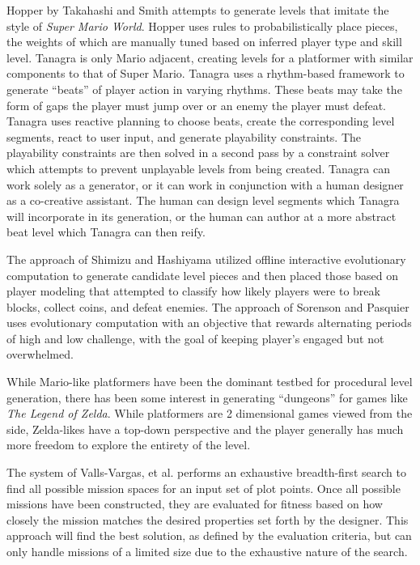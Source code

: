 \documentclass[12pt]{report}
\begin{document}
Hopper by Takahashi and Smith \cite{mario2010} attempts to generate levels that imitate the style of \textit{Super Mario World}.  Hopper uses rules to probabilistically place pieces, the weights of which are manually tuned based on inferred player type and skill level. Tanagra \cite{tanagra} is only Mario adjacent, creating levels for a platformer with similar components to that of Super Mario.  Tanagra uses a rhythm-based framework to generate ``beats'' of player action in varying rhythms.  These beats may take the form of gaps the player must jump over or an enemy the player must defeat.   Tanagra uses reactive planning to choose beats, create the corresponding level segments, react to user input, and generate playability constraints.  The playability constraints are then solved in a second pass by a constraint solver which attempts to prevent unplayable levels from being created.  Tanagra can work solely as a generator, or it can work in conjunction with a human designer as a co-creative assistant.  The human can design level segments which Tanagra will incorporate in its generation, or the human can author at a more abstract beat level which Tanagra can then reify.

The approach of Shimizu and Hashiyama \cite{mario2010} utilized offline interactive evolutionary computation to generate candidate level pieces and then placed those based on player modeling that attempted to classify how likely players were to break blocks, collect coins, and defeat enemies.  The approach of Sorenson and Pasquier \cite{mario2010} uses evolutionary computation with an objective that rewards alternating periods of high and low challenge, with the goal of keeping player's engaged but not overwhelmed.  

While Mario-like platformers have been the dominant testbed for procedural level generation, there has been some interest in generating ``dungeons'' for games like \textit{The Legend of Zelda}.  While platformers are 2 dimensional games viewed from the side, Zelda-likes have a top-down perspective and the player generally has much more freedom to explore the entirety of the level.

  The system of Valls-Vargas, et al. \cite{VARGASPLOTPOINTS} performs an exhaustive breadth-first search to find all possible  mission spaces for an input set of plot points.  Once all possible missions have been constructed, they are evaluated for fitness based on how closely the mission matches the desired properties set forth by the designer.  This approach will find the best solution, as defined by the evaluation criteria, but can only handle missions of a limited size due to the exhaustive nature of the search.  
\end{document}
